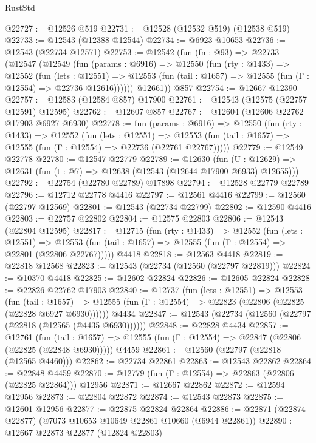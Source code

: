 \begin{lexlean}{RustStd}
\begin{coremodule}
@22727 := @12526 @519
@22731 := @12528 (@12532 @519) (@12538 @519)
@22733 := @12543 (@12388 @12544)
@22734 := @6923 @10653
@22736 := @12543 (@22734 @12571)
@22753 := @12542
    (fun (fn : @93) =>
    @22733
      (@12547
        (@12549
          (fun (params : @6916) =>
          @12550
            (fun (rty : @1433) =>
            @12552
              (fun (lets : @12551) =>
              @12553 (fun (tail : @1657) => @12555 (fun (Γ : @12554) => @22736 @12616))))))
        @12661))
    @857
@22754 := @12667 @12390
@22757 := @12583 (@12584 @857) @17900
@22761 := @12543 (@12575 (@22757 @12591) @12595)
@22762 := @12607 @857
@22767 := @12604 (@12606 @22762 @17903 @6927 @6930)
@22778 := fun (params : @6916) =>
  @12550
    (fun (rty : @1433) =>
    @12552
      (fun (lets : @12551) =>
      @12553 (fun (tail : @1657) => @12555 (fun (Γ : @12554) => @22736 (@22761 @22767)))))
@22779 := @12549 @22778
@22780 := @12547 @22779
@22789 := @12630
    (fun (U : @12629) => @12631 (fun (t : @7) => @12638 (@12543 (@12644 @17900 @6933) @12655)))
@22792 := @22754 (@22780 @22789) @17898
@22794 := @12528 @22779 @22789
@22796 := @12712 @22778 @4416
@22797 := @12561 @4416
@22799 := @12560 (@22797 @12569)
@22801 := @12543 (@22734 @22799)
@22802 := @12590 @4416
@22803 := @22757 @22802
@22804 := @12575 @22803
@22806 := @12543 (@22804 @12595)
@22817 := @12715
    (fun (rty : @1433) =>
    @12552
      (fun (lets : @12551) =>
      @12553 (fun (tail : @1657) => @12555 (fun (Γ : @12554) => @22801 (@22806 @22767)))))
    @4418
@22818 := @12563 @4418
@22819 := @22818 @12568
@22823 := @12543 (@22734 (@12560 (@22797 @22819)))
@22824 := @10370 @4418
@22825 := @12602 @22824
@22826 := @12605 @22824
@22828 := @22826 @22762 @17903
@22840 := @12737
    (fun (lets : @12551) =>
    @12553
      (fun (tail : @1657) =>
      @12555 (fun (Γ : @12554) => @22823 (@22806 (@22825 (@22828 @6927 @6930))))))
    @4434
@22847 := @12543 (@22734 (@12560 (@22797 (@22818 (@12565 (@4435 @6930))))))
@22848 := @22828 @4434
@22857 := @12761
    (fun (tail : @1657) => @12555 (fun (Γ : @12554) => @22847 (@22806 (@22825 (@22848 @6930)))))
    @4459
@22861 := @12560 (@22797 (@22818 (@12565 @4460)))
@22862 := @22734 @22861
@22863 := @12543 @22862
@22864 := @22848 @4459
@22870 := @12779 (fun (Γ : @12554) => @22863 (@22806 (@22825 @22864))) @12956
@22871 := @12667 @22862
@22872 := @12594 @12956
@22873 := @22804 @22872
@22874 := @12543 @22873
@22875 := @12601 @12956
@22877 := @22875 @22824 @22864
@22886 := @22871 (@22874 @22877) (@7073 @10653 @10649 @22861 @10660 (@6944 @22861))
@22890 := @12667 @22873 @22877 (@12824 @22803)

\end{coremodule}
\end{lexlean}
